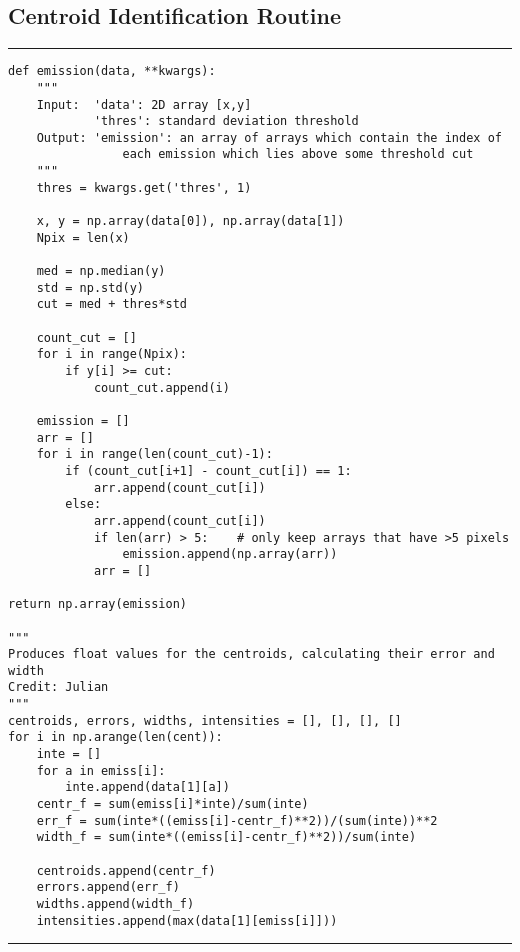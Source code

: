 \documentclass[preprint]{aastex62}
\begin{document}
\subsection{Centroid Identification Routine} \label{code:stats}
\small
\hrule
\begin{lstlisting}
def emission(data, **kwargs):
    """
    Input:  'data': 2D array [x,y]
            'thres': standard deviation threshold
    Output: 'emission': an array of arrays which contain the index of 
                each emission which lies above some threshold cut
    """
    thres = kwargs.get('thres', 1)
    
    x, y = np.array(data[0]), np.array(data[1])
    Npix = len(x)
    
    med = np.median(y)
    std = np.std(y)
    cut = med + thres*std
    
    count_cut = []
    for i in range(Npix):
        if y[i] >= cut:
            count_cut.append(i)
    
    emission = []
    arr = []
    for i in range(len(count_cut)-1):
        if (count_cut[i+1] - count_cut[i]) == 1:
            arr.append(count_cut[i])
        else:
            arr.append(count_cut[i])
            if len(arr) > 5:    # only keep arrays that have >5 pixels
                emission.append(np.array(arr))
            arr = []

return np.array(emission)

"""
Produces float values for the centroids, calculating their error and width
Credit: Julian
"""
centroids, errors, widths, intensities = [], [], [], []
for i in np.arange(len(cent)):
    inte = []
    for a in emiss[i]:
        inte.append(data[1][a])
    centr_f = sum(emiss[i]*inte)/sum(inte)
    err_f = sum(inte*((emiss[i]-centr_f)**2))/(sum(inte))**2
    width_f = sum(inte*((emiss[i]-centr_f)**2))/sum(inte)
    
    centroids.append(centr_f)
    errors.append(err_f)
    widths.append(width_f)
    intensities.append(max(data[1][emiss[i]]))
\end{lstlisting}
\hrule \vspace{7pt}
\end{document}
